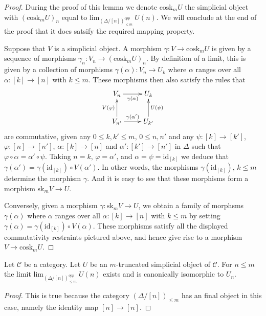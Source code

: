 \begin{proof}
During the proof of this lemma we denote $\text{cosk}_mU$ the
simplicial object with $(\text{cosk}_mU)_n$ equal to
$\text{lim}_{(\Delta/[n])_{\leq m}^{opp}}\ U(n)$.
We will conclude at the end of the proof that it does
satsify the required mapping property.

\medskip\noindent
Suppose that $V$ is a simplicial object.
A morphism $\gamma : V \to \text{cosk}_mU$ is given by a sequence
of morphisms $\gamma_n : V_n \to (\text{cosk}_mU)_n$.
By definition of a limit, this is given by a
collection of morphisms $\gamma(\alpha) : V_n \to U_k$
where $\alpha$ ranges over all $\alpha : [k] \to [n]$
with $k \leq m$. These morphisms then also satisfy
the rules that
$$
\xymatrix{
V_n \ar[r]_{\gamma(\alpha)} &  U_k \\
V_{n'} \ar[r]^{\gamma(\alpha')} \ar[u]^{V(\varphi)} & U_{k'} \ar[u]_{U(\psi)}
}
$$
are commutative, given any $0 \leq k, k' \leq m$, $0 \leq n, n'$
and any $\psi : [k] \to [k']$, $\varphi : [n] \to [n']$,
$\alpha : [k] \to [n]$ and $\alpha' : [k'] \to [n']$ in $\Delta$
such that $\varphi \circ \alpha = \alpha' \circ \psi$.
Taking $n = k$, $\varphi = \alpha'$, and $\alpha = \psi = \text{id}_{[k]}$
we deduce that $\gamma(\alpha') = \gamma(\text{id}_{[k]}) \circ V(\alpha')$.
In other words, the morphisms $\gamma(\text{id}_{[k]})$, $k \leq m$
determine the morphism $\gamma$. And it is easy to see that these
morphisms form a morphism $\text{sk}_m V \to U$.

\medskip\noindent
Conversely, given a morphism $\gamma : \text{sk}_m V \to U$, 
we obtain a family of morphsms $\gamma(\alpha)$
where $\alpha$ ranges over all $\alpha : [k] \to [n]$
with $k \leq m$ by setting $\gamma(\alpha) = 
\gamma(\text{id}_{[k]}) \circ V(\alpha)$. These morphisms
satisfy all the displayed commutativity restraints pictured
above, and hence give rise to a morphism $V \to \text{cosk}_m U$.
\end{proof}

\begin{lemma}
\label{lemma-trivial-cosk}
Let $\mathcal{C}$ be a category.
Let $U$ be an $m$-truncated simplicial object of $\mathcal{C}$.
For $n \leq m$ the limit $\text{lim}_{(\Delta/[n])_{\leq m}^{opp}}\ U(n)$
exists and is canonically isomorphic to $U_n$.
\end{lemma}

\begin{proof}
This is true because the category $(\Delta/[n])_{\leq m}$
has an final object in this case, namely the identity
map $[n] \to [n]$.
\end{proof}

